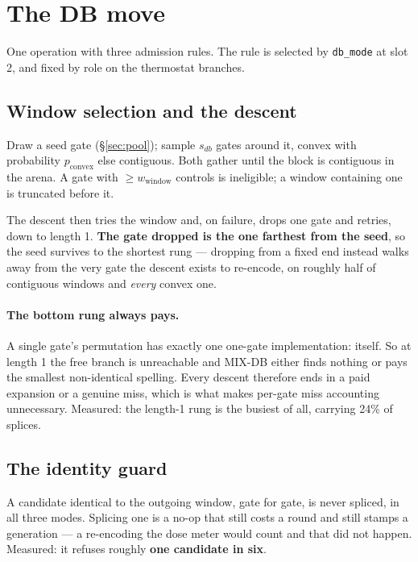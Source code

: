 \documentclass[11pt]{article}
\begin{document}
\section{The DB move}

One operation with three admission rules. The rule is selected by
\texttt{db_mode} at slot 2, and fixed by role on the thermostat branches.

\subsection{Window selection and the descent}

Draw a seed gate (\S\ref{sec:pool}); sample $s_{db}$ gates around it, convex with
probability $p_{\text{convex}}$ else contiguous. Both gather until the block is
contiguous in the arena. A gate with $\ge w_{\text{window}}$ controls is
ineligible; a window containing one is truncated before it.

The descent then tries the window and, on failure, drops one gate and retries,
down to length 1. \textbf{The gate dropped is the one farthest from the seed},
so the seed survives to the shortest rung --- dropping from a fixed end instead
walks away from the very gate the descent exists to re-encode, on roughly half
of contiguous windows and \emph{every} convex one.

\paragraph{The bottom rung always pays.} A single gate's permutation has exactly
one one-gate implementation: itself. So at length 1 the free branch is
unreachable and MIX-DB either finds nothing or pays the smallest non-identical
spelling. Every descent therefore ends in a paid expansion or a genuine miss,
which is what makes per-gate miss accounting unnecessary. Measured: the length-1
rung is the busiest of all, carrying 24\% of splices.

\subsection{The identity guard}

A candidate identical to the outgoing window, gate for gate, is never spliced,
in all three modes. Splicing one is a no-op that still costs a round and still
stamps a generation --- a re-encoding the dose meter would count and that did not
happen. Measured: it refuses roughly \textbf{one candidate in six}.
\end{document}
